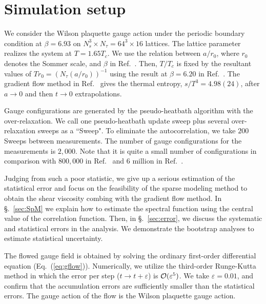 \documentclass[a4paper,11pt]{article}
\begin{document}
\section{Simulation setup}\label{sec:setup}
We consider the Wilson plaquette gauge action under the periodic boundary condition at $\beta=6.93$ on $N_s^3 \times N_\tau = 64^3 \times 16$ lattices.
The lattice parameter realizes the system at $T=1.65T_c$. 
We use the relation between $a/r_0$, where $r_0$ denotes the Sommer scale, and $\beta$ in Ref.~\cite{Guagnelli:1998ud}.
Then,  $T/T_c$ is fixed by the resultant values of $Tr_0 = (N_\tau (a/r_0))^{-1}$ using the result at $\beta= 6.20$ in Ref.~\cite{Boyd:1996bx}.
 The gradient flow method in Ref.~\cite{Asakawa:2013laa} gives the thermal entropy, $s/T^3=4.98(24)$, after $a \rightarrow 0$ and then $t\rightarrow 0$ extrapolations.


Gauge configurations are generated by the pseudo-heatbath algorithm with the over-relaxation.
We call one pseudo-heatbath update sweep plus several over-relaxation sweeps
as a ``Sweep". 
To eliminate the autocorrelation, we take $200$ Sweeps between measurements. 
The number of gauge configurations for the measurements is $2,000$. 
Note that it is quite a small number of configurations in comparison with $800,000$ in Ref.~\cite{Nakamura:2004sy} and $6$ million in Ref.~\cite{Pasztor:2018yae}.


Judging from such a poor statistic, we give up a serious estimation of the statistical error and focus on the feasibility of the sparse modeling method to obtain the shear viscosity combing with the gradient flow method.
In \S.~\ref{sec:SpM} we explain how to estimate the spectral function using the central value of the correlation function.
Then, in \S.~\ref{sec:error}, we discuss the systematic and statistical errors in the analysis.
We demonstrate the bootstrap analyses to estimate  statistical uncertainty.


The flowed gauge field is obtained by solving the ordinary first-order differential equation (Eq.~(\ref{eq:gflow})). 
Numerically, we utilize the third-order Runge-Kutta method in which the error per step ($t \rightarrow t+ \varepsilon$) is ${\cal O}(\varepsilon^5)$. 
We take $\varepsilon= 0.01$, and confirm that the accumulation errors are sufficiently smaller than the statistical errors.
The gauge action of the flow is the Wilson plaquette gauge action.
\end{document}
